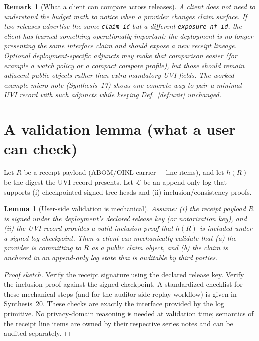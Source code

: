 \documentclass[11pt]{article}
\newtheorem{remark}{Remark}
\newtheorem{lemma}{Lemma}
\begin{document}
\begin{remark}[What a client can compare across releases]
A client does not need to understand the budget math to notice when a provider changes claim surface.
If two releases advertise the same \texttt{claim\_id} but a different \texttt{exposure\_nf\_id}, the client has learned something operationally important: the deployment is no longer presenting the same interface claim and should expose a new receipt lineage.
Optional deployment-specific adjuncts may make that comparison easier (for example a watch policy or a compact compare profile), but those should remain \emph{adjacent} public objects rather than extra mandatory UVI fields.
The worked-example micro-note (Synthesis~17) shows one concrete way to pair a minimal UVI record with such adjuncts while keeping Def.~\ref{def:uvir} unchanged.\cite{series:workedexample}
\end{remark}

\section{A validation lemma (what a user can check)}
Let $R$ be a receipt payload (ABOM/OINL carrier + line items), and let $h(R)$ be the digest the UVI record presents.
Let $\mathcal{L}$ be an append-only log that supports (i) checkpointed signed tree heads and (ii) inclusion/consistency proofs.\cite{series:transparencyprimitives}

\begin{lemma}[User-side validation is mechanical]\label{lem:validate}
Assume:
(i) the receipt payload $R$ is signed under the deployment's declared release key (or notarization key), and
(ii) the UVI record provides a valid inclusion proof that $h(R)$ is included under a signed log checkpoint.
Then a client can mechanically validate that (a) the provider is committing to $R$ as a public claim object, and (b) the claim is anchored in an append-only log state that is auditable by third parties.
\end{lemma}

\begin{proof}[Proof sketch]
Verify the receipt signature using the declared release key.
Verify the inclusion proof against the signed checkpoint.
A standardized checklist for these mechanical steps (and for the auditor-side replay workflow) is given in Synthesis~20.\cite{series:auditorreplay}
These checks are exactly the interface provided by the log primitive.\cite{series:transparencyprimitives}
No privacy-domain reasoning is needed at validation time; semantics of the receipt line items are owned by their respective series notes and can be audited separately.\cite{series:receiptitems}
\end{proof}
\end{document}
